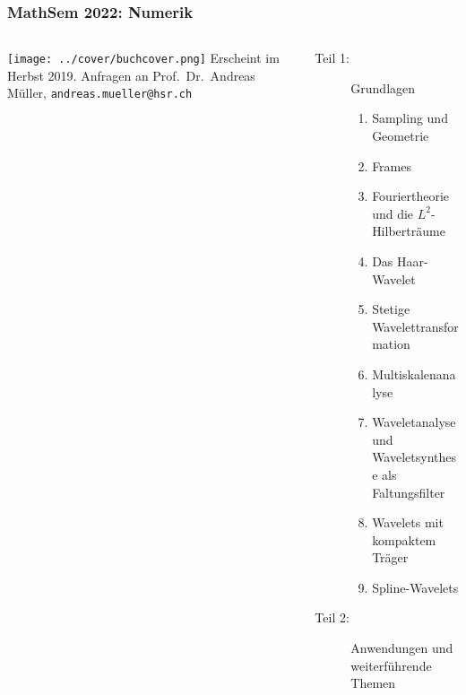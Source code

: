 \documentclass[handout]{beamer}
\title[]{}
\begin{document}
\begin{frame}
\frametitle{%
MathSem 2022: Numerik}
\begin{columns}[onlytextwidth]
\begin{column}{0.31\textwidth}
\texttt{[image: ../cover/buchcover.png]}
\vskip 0.2cm
\bigskip
\bigskip
Erscheint im Herbst 2019.
Anfragen an
Prof.~Dr.~Andreas Müller,
{\texttt{andreas.mueller@hsr.ch}}
\bigskip
\bigskip
\bigskip
\end{column}
\begin{column}{0.67\textwidth}
\begin{description}
\item[Teil 1:] Grundlagen
\begin{enumerate}
\item Sampling und Geometrie
\item Frames
\item Fouriertheorie und die $L^2$-Hilberträume
\item Das Haar-Wavelet
\item Stetige Wavelettransformation
\item Multiskalenanalyse
\item Waveletanalyse und Waveletsynthese als Faltungsfilter
\item Wavelets mit kompaktem Träger
\item Spline-Wavelets
\end{enumerate}
\item[Teil 2:] Anwendungen und weiterführende Themen
\begin{enumerate}
\setcounter{enumi}{9}
\end{enumerate}
\end{description}
\end{column}
\end{columns}
\end{frame}
\end{document}
